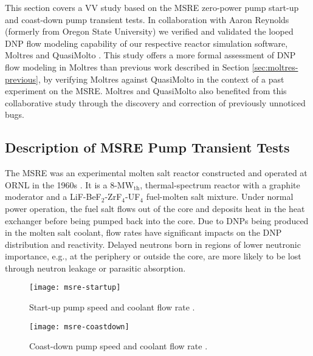 This section covers a \gls{VV} study based on the \gls{MSRE} zero-power pump
start-up and coast-down pump transient tests. In collaboration with Aaron Reynolds (formerly from
Oregon State University) we verified and validated the looped \gls{DNP} flow modeling capability of
our respective reactor simulation software, Moltres and QuasiMolto \cite{reynolds_analysis_2023}.
This study offers a more formal assessment of \gls{DNP} flow modeling in Moltres than previous
work described in Section \ref{sec:moltres-previous}, by verifying Moltres against QuasiMolto in
the context of a past experiment on the \gls{MSRE}. Moltres and QuasiMolto also benefited from this
collaborative study through the discovery and correction of previously unnoticed bugs.

\subsection{Description of MSRE Pump Transient Tests}

The \gls{MSRE} was an experimental molten salt reactor constructed and operated at \gls{ORNL} in
the 1960s \cite{haubenreich_experience_1970}. It is a 8-MW$_{\text{th}}$, thermal-spectrum reactor
with a graphite moderator and a LiF-BeF$_2$-ZrF$_4$-UF$_4$ fuel-molten salt mixture. Under normal
power operation, the fuel salt flows out of the core and deposits heat in the heat exchanger before
being pumped back into the core. Due to
\glspl{DNP} being produced in the molten salt coolant, flow rates have significant impacts on the
\gls{DNP} distribution and reactivity. Delayed neutrons born in regions of lower neutronic
importance, e.g., at the periphery or outside the core, are more likely to be lost through neutron
leakage or parasitic absorption.

\begin{figure}[htb]
  \centering
  \begin{minipage}[t]{0.49\textwidth}
    \centering
    \texttt{[image: msre-startup]}
    \caption{Start-up pump speed and coolant flow rate \cite{prince_zero-power_1968}.}
    \label{fig:msre-startup}
  \end{minipage}
  \hfill
  \begin{minipage}[t]{0.49\textwidth}
    \centering
    \texttt{[image: msre-coastdown]}
    \caption{Coast-down pump speed and coolant flow rate \cite{prince_zero-power_1968}.}
    \label{fig:msre-coastdown}
  \end{minipage}
\end{figure}

